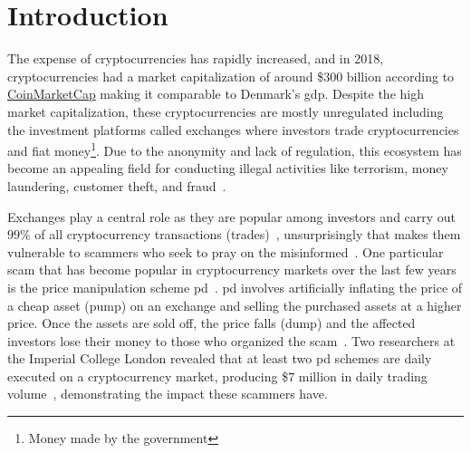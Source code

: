 
\chapter{Introduction}\label{ch:introduction}\glsresetall
The expense of cryptocurrencies has rapidly increased, and in 2018, cryptocurrencies had a market capitalization of around \$$300$ billion according to \href{https://coinmarketcap.com/}{CoinMarketCap} making it comparable to Denmark's \ac{gdp}\cite{P&D_to_the_moon}. Despite the high market capitalization, these cryptocurrencies are mostly unregulated including the investment platforms called exchanges where investors trade cryptocurrencies and fiat money\footnote{Money made by the government\cite{fiat}}. Due to the anonymity and lack of regulation, this ecosystem has become an appealing field for conducting illegal activities like terrorism, money laundering, customer theft, and fraud~\cite{bitcoin_regulation}.

Exchanges play a central role as they are popular among investors and carry out $99\%$ of all cryptocurrency transactions (trades)~\cite{coinsutra}, unsurprisingly that makes them vulnerable to scammers who seek to pray on the misinformed~\cite{P&D_to_the_moon}. One particular scam that has become popular in cryptocurrency markets over the last few years is the price manipulation scheme \ac{pd}~\cite{P&D_anatomy}. \ac{pd} involves artificially inflating the price of a cheap asset (pump) on an exchange and selling the purchased assets at a higher price. Once the assets are sold off, the price falls (dump) and the affected investors lose their money to those who organized the scam~\cite{P&D_scheme}. Two researchers at the Imperial College London revealed that at least two \ac{pd} schemes are daily executed on a cryptocurrency market, producing \$$7$ million in daily trading volume~\cite{P&D_anatomy}, demonstrating the impact these scammers have.

